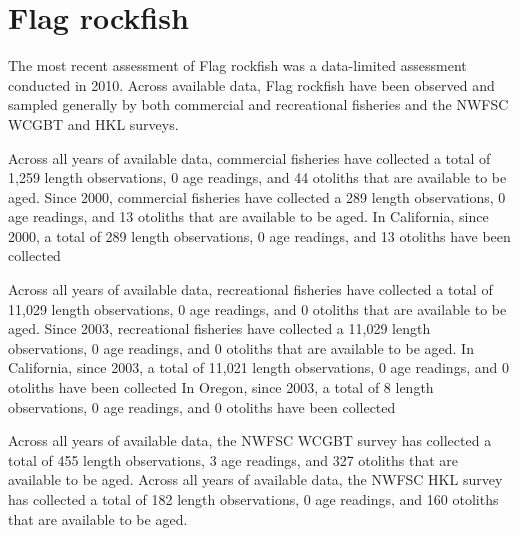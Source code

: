 \documentclass[11pt,
  english,
  letterpaper,
]{article}
\begin{document}

\hypertarget{flag-rockfish}{%
\section{Flag rockfish}\label{flag-rockfish}}

\leavevmode\tagmcend\tagstructend


The most recent assessment of Flag rockfish was a data-limited assessment conducted in 2010. Across available data, Flag rockfish have been observed and sampled generally by both commercial and recreational fisheries and the NWFSC WCGBT and HKL surveys.

\leavevmode\tagmcend\tagstructend\par


Across all years of available data, commercial fisheries have collected a total of 1,259 length observations, 0 age readings, and 44 otoliths that are available to be aged. Since 2000, commercial fisheries have collected a 289 length observations, 0 age readings, and 13 otoliths that are available to be aged. In California, since 2000, a total of 289 length observations, 0 age readings, and 13 otoliths have been collected

\leavevmode\tagmcend\tagstructend\par


Across all years of available data, recreational fisheries have collected a total of 11,029 length observations, 0 age readings, and 0 otoliths that are available to be aged. Since 2003, recreational fisheries have collected a 11,029 length observations, 0 age readings, and 0 otoliths that are available to be aged. In California, since 2003, a total of 11,021 length observations, 0 age readings, and 0 otoliths have been collected In Oregon, since 2003, a total of 8 length observations, 0 age readings, and 0 otoliths have been collected

\leavevmode\tagmcend\tagstructend\par


Across all years of available data, the NWFSC WCGBT survey has collected a total of 455 length observations, 3 age readings, and 327 otoliths that are available to be aged. Across all years of available data, the NWFSC HKL survey has collected a total of 182 length observations, 0 age readings, and 160 otoliths that are available to be aged.
\end{document}

